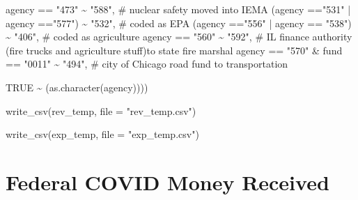 \documentclass[
  letterpaper,
  DIV=11,
  numbers=noendperiod]{scrreport}
\newenvironment{Shaded}{\begin{snugshade}}{\end{snugshade}}
\newcommand{\AttributeTok}[1]{\textcolor[rgb]{0.40,0.45,0.13}{#1}}
\newcommand{\CommentTok}[1]{\textcolor[rgb]{0.37,0.37,0.37}{#1}}
\newcommand{\ConstantTok}[1]{\textcolor[rgb]{0.56,0.35,0.01}{#1}}
\newcommand{\FunctionTok}[1]{\textcolor[rgb]{0.28,0.35,0.67}{#1}}
\newcommand{\NormalTok}[1]{\textcolor[rgb]{0.00,0.23,0.31}{#1}}
\newcommand{\SpecialCharTok}[1]{\textcolor[rgb]{0.37,0.37,0.37}{#1}}
\newcommand{\StringTok}[1]{\textcolor[rgb]{0.13,0.47,0.30}{#1}}
\begin{document}
\begin{Shaded}
\begin{Highlighting}[]
\NormalTok{    agency }\SpecialCharTok{==} \StringTok{"473"} \SpecialCharTok{\textasciitilde{}} \StringTok{"588"}\NormalTok{, }\CommentTok{\# nuclear safety moved into IEMA}
\NormalTok{    (agency }\SpecialCharTok{==}\StringTok{"531"} \SpecialCharTok{|}\NormalTok{ agency }\SpecialCharTok{==}\StringTok{"577"}\NormalTok{) }\SpecialCharTok{\textasciitilde{}} \StringTok{"532"}\NormalTok{, }\CommentTok{\# coded as EPA}
\NormalTok{    (agency }\SpecialCharTok{==}\StringTok{"556"} \SpecialCharTok{|}\NormalTok{ agency }\SpecialCharTok{==} \StringTok{"538"}\NormalTok{) }\SpecialCharTok{\textasciitilde{}} \StringTok{"406"}\NormalTok{, }\CommentTok{\# coded as agriculture}
\NormalTok{    agency }\SpecialCharTok{==} \StringTok{"560"} \SpecialCharTok{\textasciitilde{}} \StringTok{"592"}\NormalTok{, }\CommentTok{\# IL finance authority (fire trucks and agriculture stuff)to state fire marshal}
\NormalTok{    agency }\SpecialCharTok{==} \StringTok{"570"} \SpecialCharTok{\&}\NormalTok{ fund }\SpecialCharTok{==} \StringTok{"0011"} \SpecialCharTok{\textasciitilde{}} \StringTok{"494"}\NormalTok{,   }\CommentTok{\# city of Chicago road fund to transportation}

    \ConstantTok{TRUE} \SpecialCharTok{\textasciitilde{}}\NormalTok{ (}\FunctionTok{as.character}\NormalTok{(agency))))}
\end{Highlighting}
\end{Shaded}

\begin{Shaded}
\begin{Highlighting}[]
\FunctionTok{write\_csv}\NormalTok{(rev\_temp, }\AttributeTok{file =} \StringTok{"rev\_temp.csv"}\NormalTok{)}

\FunctionTok{write\_csv}\NormalTok{(exp\_temp, }\AttributeTok{file =} \StringTok{"exp\_temp.csv"}\NormalTok{)}
\end{Highlighting}
\end{Shaded}


\hypertarget{sec-covid-federal-funds}{%
\chapter{Federal COVID Money Received}\label{sec-covid-federal-funds}}
\end{document}
